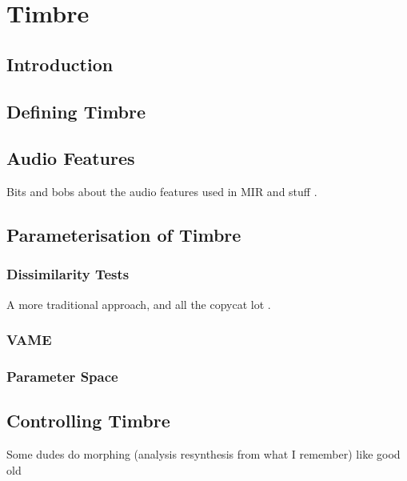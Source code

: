 
\chapter{Timbre}
\label{chap:Timbre}

\section{Introduction}
\label{sec:Timbre-Introduction}

\section{Defining Timbre}
\label{sec:Timbre-Definition}

\section{Audio Features}
\label{sec:Timbre-Features}
	\note
	{
		Bits and bobs about the audio features used in MIR and stuff \citep{peeters2004a}.
	}

\section{Parameterisation of Timbre}
\label{sec:Timbre-Parameterisation}

	\subsection{Dissimilarity Tests}
	\label{sec:Timbre-Dissimilarity}
		\note
		{
			A more traditional approach, \citet{grey1977multidimensional} and all the copycat lot \citep{burgoyne2008a, caclin2005acoustic}.
		}

	\subsection{VAME}
	\label{sec:Timbre-VAME}

	\subsection{Parameter Space}
	\label{sec:Timbre-ParameterSpaces}

\section{Controlling Timbre}
\label{sec:Timbre-Control}
	
	\note
	{
		Some dudes do morphing (analysis resynthesis from what I remember) like good old \citet{williams2007perceptually, williams2009perceptually, williams2010perceptually}
	}

